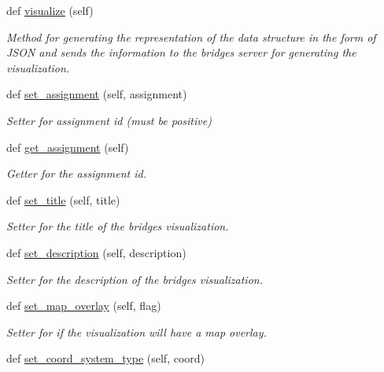\begin{DoxyCompactItemize}
def \hyperlink{classbridges_1_1bridges_1_1_bridges_a3c1321f8be7b249639a47eba10b67c70}{visualize} (self)
\begin{DoxyCompactList}\small\item\em Method for generating the representation of the data structure in the form of J\+S\+ON and sends the information to the bridges server for generating the visualization. \end{DoxyCompactList}\item 
def \hyperlink{classbridges_1_1bridges_1_1_bridges_add46441bec1c93095c48adc724b90e12}{set\+\_\+assignment} (self, assignment)
\begin{DoxyCompactList}\small\item\em Setter for assignment id (must be positive) \end{DoxyCompactList}\item 
def \hyperlink{classbridges_1_1bridges_1_1_bridges_a1e7bd56f6a3beb03c91fc989cf3f7eb8}{get\+\_\+assignment} (self)
\begin{DoxyCompactList}\small\item\em Getter for the assignment id. \end{DoxyCompactList}\item 
def \hyperlink{classbridges_1_1bridges_1_1_bridges_a3b0c629c1ae0beaac05fa9d90846c423}{set\+\_\+title} (self, title)
\begin{DoxyCompactList}\small\item\em Setter for the title of the bridges visualization. \end{DoxyCompactList}\item 
def \hyperlink{classbridges_1_1bridges_1_1_bridges_aba86088c031b505bbe88dbc530bf1331}{set\+\_\+description} (self, description)
\begin{DoxyCompactList}\small\item\em Setter for the description of the bridges visualization. \end{DoxyCompactList}\item 
def \hyperlink{classbridges_1_1bridges_1_1_bridges_ae9ed34b5878d9d120949da0b7e4d2911}{set\+\_\+map\+\_\+overlay} (self, flag)
\begin{DoxyCompactList}\small\item\em Setter for if the visualization will have a map overlay. \end{DoxyCompactList}\item 
def \hyperlink{classbridges_1_1bridges_1_1_bridges_a6bc905490b1995234f88f47af9aa8a17}{set\+\_\+coord\+\_\+system\+\_\+type} (self, coord)

\end{DoxyCompactItemize}
